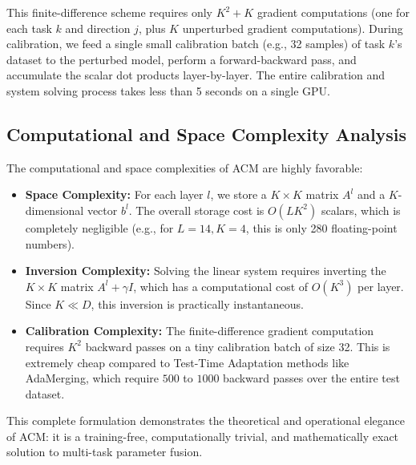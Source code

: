 This finite-difference scheme requires only $K^2 + K$ gradient computations (one for each task $k$ and direction $j$, plus $K$ unperturbed gradient computations). During calibration, we feed a single small calibration batch (e.g., 32 samples) of task $k$'s dataset to the perturbed model, perform a forward-backward pass, and accumulate the scalar dot products layer-by-layer. The entire calibration and system solving process takes less than 5 seconds on a single GPU.

\subsection{Computational and Space Complexity Analysis}
The computational and space complexities of ACM are highly favorable:
\begin{itemize}
    \item \textbf{Space Complexity:} For each layer $l$, we store a $K \times K$ matrix $A^l$ and a $K$-dimensional vector $b^l$. The overall storage cost is $O(L K^2)$ scalars, which is completely negligible (e.g., for $L=14, K=4$, this is only 280 floating-point numbers).
    \item \textbf{Inversion Complexity:} Solving the linear system requires inverting the $K \times K$ matrix $A^l + \gamma I$, which has a computational cost of $O(K^3)$ per layer. Since $K \ll D$, this inversion is practically instantaneous.
    \item \textbf{Calibration Complexity:} The finite-difference gradient computation requires $K^2$ backward passes on a tiny calibration batch of size 32. This is extremely cheap compared to Test-Time Adaptation methods like AdaMerging, which require $500$ to $1000$ backward passes over the entire test dataset.
\end{itemize}
This complete formulation demonstrates the theoretical and operational elegance of ACM: it is a training-free, computationally trivial, and mathematically exact solution to multi-task parameter fusion.
